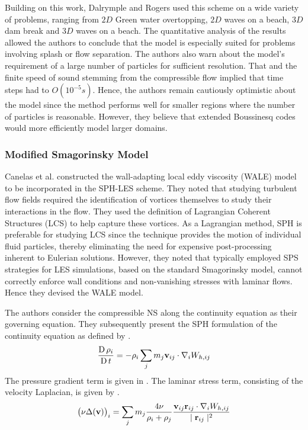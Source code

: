 Building on this work, Dalrymple and Rogers \parencite{Dalrymple2006} used this scheme on a wide variety of problems, ranging from $2D$ Green water overtopping, $2D$ waves on a beach, $3D$ dam break and $3D$ waves on a beach. The quantitative analysis of the results allowed the authors to conclude that the model is especially suited for problems involving splash or flow separation. The authors also warn about the model’s requirement of a large number of particles for sufficient resolution. That and the finite speed of sound stemming from the compressible flow implied that time steps had to $O(10^{-5}s)$. Hence, the authors remain cautiously optimistic about the model since the method performs well for smaller regions where the number of particles is reasonable. However, they believe that extended Boussinesq codes would more efficiently model larger domains.

\subsubsection{Modified Smagorinsky Model}
Canelas et al. \parencite{Canelas2016} constructed the wall-adapting local eddy viscosity (WALE) model to be incorporated in the SPH-LES scheme. They noted that studying turbulent flow fields required the identification of vortices themselves to study their interactions in the flow. They used the definition of Lagrangian Coherent Structures (LCS) to help capture these vortices. As a Lagrangian method, SPH is preferable for studying LCS since the technique provides the motion of individual fluid particles, thereby eliminating the need for expensive post-processing inherent to Eulerian solutions. 
However, they noted that typically employed SPS strategies for LES simulations, based on the standard Smagorinsky model, cannot correctly enforce wall conditions and non-vanishing stresses with laminar flows. Hence they devised the WALE model.

The authors consider the compressible NS along the continuity equation as their governing equation. They subsequently present the SPH formulation of the continuity equation as defined by .
\begin{equation}
    \frac{\operatorname{D} \rho_i}{\operatorname{D} t} = - \rho_i \sum_j m_j \mathbf{v}_{ij} \cdot \nabla_{i} W_{h, ij}
    \label{eq:Canelas2016-continuity-sph}
\end{equation}
The pressure gradient term is given in . The laminar stress term, consisting of the velocity Laplacian, is given by . 
\begin{equation}
    \big(\nu \Delta(\mathbf{v}) \big)_i = \sum_j m_j \frac{4 \nu}{\rho_i + \rho_j}\frac{\mathbf{v}_{ij} \mathbf{r}_{ij} \cdot \nabla_{i} W_{h, ij}}{\mid \mathbf{r}_{ij} \mid^{2}}
    \label{eq:Canelas2016-vel-laplacian-sph}
\end{equation}

